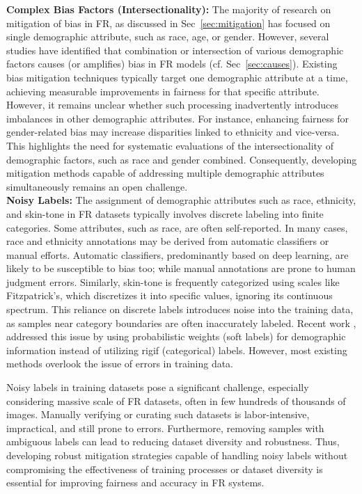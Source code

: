 \noindent\textbf{Complex Bias Factors (Intersectionality):}
The majority of research on mitigation of bias in FR, as discussed in
Sec~\ref{sec:mitigation} has focused on single demographic attribute, such as
race, age, or gender. However, several studies have identified that combination
or intersection of various demographic factors causes (or amplifies) bias in FR
models (cf. Sec~\ref{sec:causes}). Existing bias mitigation techniques typically
target one demographic attribute at a time, achieving measurable improvements in
fairness for that specific attribute. However, it remains unclear whether such
processing inadvertently introduces imbalances in other demographic attributes.
For instance, enhancing fairness for gender-related bias may increase
disparities linked to ethnicity and vice-versa. This highlights the need for
systematic evaluations of the intersectionality of demographic factors, such as
race and gender combined. Consequently, developing mitigation methods capable of
addressing multiple demographic attributes simultaneously remains an open
challenge. \\

\noindent\textbf{Noisy Labels:}
The assignment of demographic attributes such as race, ethnicity, and skin-tone
in FR datasets typically involves discrete labeling into finite categories. Some
attributes, such as race, are often self-reported. In many cases, race and
ethnicity annotations may be derived from automatic classifiers or manual
efforts. Automatic classifiers, predominantly based on deep learning, are likely
to be susceptible to bias too; while manual annotations are prone to human
judgment errors. Similarly, skin-tone is frequently categorized using scales
like Fitzpatrick's, which discretizes it into specific values, ignoring its
continuous spectrum. This reliance on discrete labels introduces noise into the
training data, as samples near category boundaries are often inaccurately
labeled. Recent work \cite{kotwal2024demographic}, addressed this issue by using
probabilistic weights (soft labels) for demographic information instead of
utilizing rigif (categorical) labels. However, most existing methods overlook
the issue of errors in training data.
%

Noisy labels in training datasets pose a significant challenge, especially
considering massive scale of FR datasets, often in few hundreds of thousands of
images. Manually verifying or curating such datasets is labor-intensive,
impractical, and still prone to errors. Furthermore, removing samples with
ambiguous labels can lead to reducing dataset diversity and robustness. Thus,
developing robust mitigation strategies capable of handling noisy labels without
compromising the effectiveness of training processes or dataset diversity is
essential for improving fairness and accuracy in FR systems.
